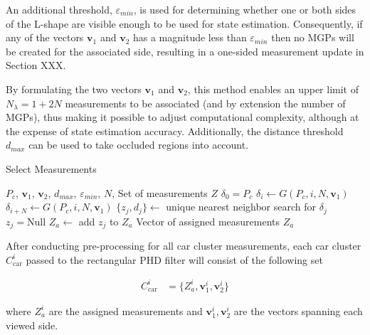 An additional threshold, $\varepsilon_{min}$, is used for determining whether one or both sides of the L-shape are visible enough to be used for state estimation. Consequently, if any of the vectors $\mathbf{v}_1$ and $\mathbf{v}_2$ has a magnitude less than $\varepsilon_{min}$ then no MGPs will be created for the associated side, resulting in a one-sided measurement update in Section XXX.

By formulating the two vectors $\mathbf{v}_1$ and $\mathbf{v}_2$, this method enables an upper limit of $N_{\lambda} = 1+2N$ measurements to be associated (and by extension the number of MGPs), thus making it possible to adjust computational complexity, although at the expense of state estimation accuracy. Additionally, the distance threshold $d_{max}$ can be used to take occluded regions into account. 


\begin{algorithm}[H]
\caption{Select Measurements}\label{meas}
\begin{algorithmic}
\Input $P_c$, $\mathbf{v}_1$, $\mathbf{v}_2$, $d_{max}$, $\varepsilon_{min}$, $N$, Set of measurements $Z$
\State $\delta_0 = P_c$
\State $\delta_i \leftarrow G(P_c, i, N, \mathbf{v}_1)$
\EndFor
\EndIf
{}
\State $\delta_{i+N} \leftarrow G(P_c, i, N, \mathbf{v}_1)$
\EndFor
\EndIf
{}
\State $\{z_j,d_j\} \leftarrow$ unique nearest neighbor search for $\delta_j$
\State $z_j = \text{Null}$
\EndIf
\State $Z_a \leftarrow$ add $z_j$ to $Z_a$ 
\EndFor
\Output Vector of assigned measurements $Z_{a}$
\end{algorithmic}
\end{algorithm}

After conducting pre-processing for all car cluster measurements, each car cluster $C_{\text{car}}^{i}$ passed to the rectangular PHD filter will consist of the following set

\begin{equation}
    \begin{split}
        C_{\text{car}}^{i} &= \{Z^i_a, \mathbf{v}_{1}^i, \mathbf{v}_{2}^i\}
    \end{split}
\end{equation}

where $Z^i_a$ are the assigned measurements and $\mathbf{v}_{1}^i, \mathbf{v}_{2}^i$ are the vectors spanning each viewed side. 

